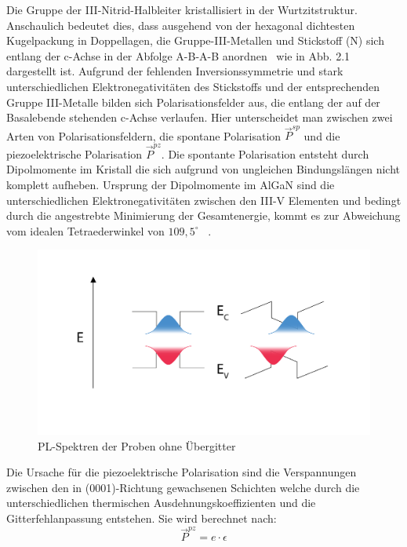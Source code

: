 Die Gruppe der III-Nitrid-Halbleiter kristallisiert in der Wurtzitstruktur. Anschaulich bedeutet dies, dass ausgehend von der hexagonal dichtesten Kugelpackung in Doppellagen, die Gruppe-III-Metallen und Stickstoff (N) sich entlang der c-Achse in der Abfolge A-B-A-B anordnen~\cite{buchc} wie in Abb. 2.1 dargestellt ist. 
\newline
Aufgrund der fehlenden Inversionssymmetrie und stark unterschiedlichen Elektronegativitäten des Stickstoffs und der entsprechenden Gruppe III-Metalle bilden sich Polarisationsfelder aus, die entlang der auf der Basalebende stehenden c-Achse verlaufen. Hier unterscheidet man zwischen zwei Arten von Polarisationsfeldern, die spontane Polarisation $ \vec{P}^{sp} $ und die piezoelektrische Polarisation $ \vec{P}^{pz} $.
\newline\newline
Die spontante Polarisation entsteht durch Dipolmomente im Kristall die sich aufgrund von ungleichen Bindungslängen nicht komplett aufheben. Ursprung der 
Dipolmomente im AlGaN sind die unterschiedlichen Elektronegativitäten zwischen den III-V Elementen und bedingt durch die angestrebte Minimierung der Gesamtenergie, kommt es zur Abweichung vom idealen Tetraederwinkel von $109,5^{\circ}$ ~\cite{ambacher2002}.
%
\begin{figure}[htb]
    \centering
    \begin{minipage}[t]{0.7\linewidth}
        \centering
        \includegraphics[width=\linewidth]{Bilder/QCSE.pdf}
        \caption{PL-Spektren der Proben ohne Übergitter}
    \end{minipage}%
\end{figure}
\vspace{1cm}
\raggedright
\newpage
Die Ursache für die piezoelektrische Polarisation sind die Verspannungen zwischen den in (0001)-Richtung gewachsenen Schichten welche durch die unterschiedlichen thermischen Ausdehnungskoeffizienten und die Gitterfehlanpassung entstehen. Sie wird berechnet nach: 
%
\begin{equation}
    \vec{P}^{pz} = e \cdot \epsilon
\end{equation}
%